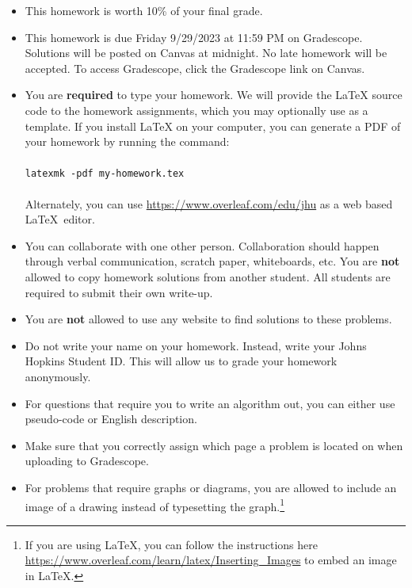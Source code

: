 \documentclass[letter,11pt]{article}
\begin{document}
\begin{itemize}
\item This homework is worth 10\% of your final grade.

\item This homework is due Friday 9/29/2023 at 11:59 PM on
  Gradescope.  Solutions will be posted on Canvas at midnight.  No late homework will be accepted.  To access Gradescope, click the Gradescope link on Canvas.

\item You are \textbf{required} to type your homework.  We will
  provide the \LaTeX{} source code to the homework assignments, which you may
  optionally use as a template.  If you install \LaTeX{} on your computer, you can
  generate a PDF of
  your homework by running the command: \\
  \\
  \texttt{latexmk~-pdf~my-homework.tex} \\
  \\
  Alternately, you can use \url{https://www.overleaf.com/edu/jhu} as a web based
  \LaTeX~editor.

\item You can collaborate with one other person.
    Collaboration should happen through verbal communication, scratch paper,
    whiteboards, etc.  You are \textbf{not} allowed to copy homework
    solutions from another student.  All students are required to submit their
    own write-up.

\item You are \textbf{not} allowed to use any website to find solutions to these problems.

\item Do not write your name on your homework. Instead, write your Johns Hopkins Student ID.  This will allow us to grade your homework anonymously.

\item For questions that require you to write an algorithm out, you can either use pseudo-code or English description.

\item Make sure that you correctly assign which page a problem is located on when uploading to Gradescope.

\item For problems that require graphs or diagrams, you are allowed to include an image of a drawing instead of typesetting the graph.\footnote{If you are using LaTeX, you can follow the instructions here \url{https://www.overleaf.com/learn/latex/Inserting_Images} to embed an image in LaTeX.}
\end{itemize}
\end{document}
